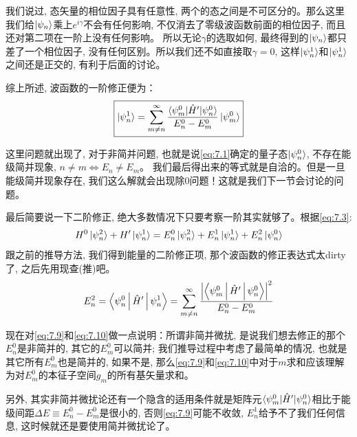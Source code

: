 \documentclass[a4paper,zihao=-4,linespread=1]{ctexrep}
\newenvironment{lequation}{\large\begin{equation}}{\end{equation}}
\begin{document}
    我们说过, 态矢量的相位因子具有任意性, 两个的态之间是不可区分的。那么这里我们给$\ket{\psi_n}$乘上$e^{i\gamma}$不会有任何影响, 不仅消去了零级波函数前面的相位因子, 而且还对第二项在一阶上没有任何影响。
    所以无论$\gamma$的选取如何, 最终得到的$\ket{\psi_n}$都只差了一个相位因子, 没有任何区别。所以我们还不如直接取$\gamma=0$, 这样$\ket{\psi_n^1}$和$\ket{\psi_n^1}$之间还是正交的, 有利于后面的讨论。
    
    综上所述, 波函数的一阶修正便为：
    \begin{lequation}
        \label{eq:7.9}
        \boxed{
            \ket{\psi_n^1}=\sum\limits_{m\neq n}^\infty \frac{\braket{\psi_m^0|\hat{H}^\prime|\psi_n^0}}{E_n^0-E^0_m}\ket{\psi_m^0}
        }
    \end{lequation}
    
    这里问题就出现了, 对于非简并问题, 也就是说\ref{eq:7.1}确定的量子态$\ket{\psi_n^0}$, 不存在能级简并现象, $n \neq m \Leftrightarrow E_n\neq E_m$。
    我们最后得出来的等式就是自洽的。但是一旦能级简并现象存在, 我们这么解就会出现除0问题！这就是我们下一节会讨论的问题。

    最后简要说一下二阶修正, 绝大多数情况下只要考察一阶其实就够了。根据\ref{eq:7.3}:
    \[H^0 \ket{\psi_n^2}+H^{\prime} \ket{\psi_n^1}=E_n^0 \ket{\psi_n^2}+E_n^1 \ket{\psi_n^1}+E_n^2 \ket{\psi_n^0}\]
    跟之前的推导方法, 我们得到能量的二阶修正项, 那个波函数的修正表达式太dirty了, 之后先用现查(推)吧。
    \begin{lequation}
        \label{eq:7.10}
        E_n^2=\Braket{\psi_n^0|\hat{H}^\prime|\psi_n^1}=\sum\limits_{m\neq n}^\infty\frac{\left|\Braket{\psi_m^0|\hat{H}^\prime|\psi_n^0}\right|^2}{E_n^0-E_m^0}
    \end{lequation}

    现在对\ref{eq:7.9}和\ref{eq:7.10}做一点说明：所谓非简并微扰, 是说我们想去修正的那个$E^0_n$是非简并的, 其它的$E^0_m$可以简并; 我们推导过程中考虑了最简单的情况,
    也就是其它所有$E^0_m$也是简并的, 如果不是, 那么\ref{eq:7.9}和\ref{eq:7.10}中对于$m$求和应该理解为对$E_m^0$的本征子空间$g_m$的所有基矢量求和。

    另外, 其实非简并微扰论还有一个隐含的适用条件就是矩阵元$\braket{\psi_m^0|\hat{H}^\prime|\psi_n^0}$相比于能级间距$\Delta E\equiv E_n^0-E_m^0$是很小的, 否则\ref{eq:7.9}可能不收敛, 
    $E_n^1$给予不了我们任何信息, 这时候就还是要使用简并微扰论了。
\end{document}
